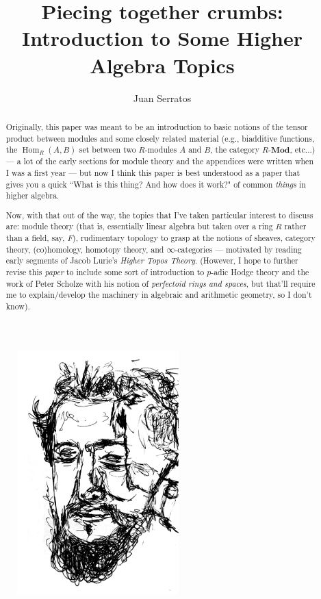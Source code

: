 \documentclass[12pt,reqno]{amsart}
\title{Piecing together crumbs: Introduction to Some Higher Algebra Topics}
\author{Juan Serratos}
\theoremstyle{plain}
\DeclareMathOperator{\Hom}{Hom}
\begin{document}
\begin{abstract}
Originally, this paper was meant to be an introduction to basic notions of the tensor product between modules and some closely related material (e.g., biadditive functions, the $\Hom_R (A, B)$ set between two $R$-modules $A$ and $B$,  the category $R$-$\mathbf{Mod}$, etc...) — a lot of the early sections for module theory and the appendices were written when I was a first year —  but now I think this paper is best understood as a paper that gives you a quick ``What is this thing? And how does it work?" of common \textit{things} in higher algebra. 

Now, with that out of the way, the topics that I've taken particular interest to discuss are: module theory (that is, essentially linear algebra but taken over a ring $R$ rather than a field, say, $F$), rudimentary topology to grasp at the notions of sheaves, category theory,  (co)homology, homotopy theory, and $\infty$-categories — motivated by reading early segments of Jacob Lurie's \textit{Higher Topos Theory}.  (However, I hope to further revise this \textit{paper} to include some sort of introduction to $p$-adic Hodge theory and the work of Peter Scholze with his notion of \textit{perfectoid rings and spaces}, but that'll require me to explain/develop the machinery in algebraic and arithmetic geometry, so I don't know). 
\end{abstract}
\begin{figure}[h] %
\includegraphics[scale=.2]{pic.png} 
\end{figure}
\end{document}
